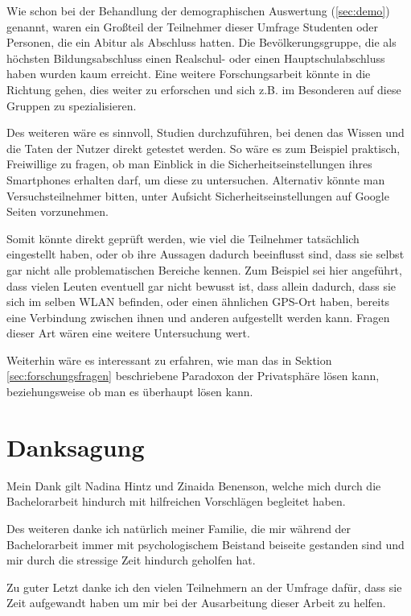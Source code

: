 Wie schon bei der Behandlung der demographischen Auswertung (\ref{sec:demo}) genannt, waren ein Großteil der Teilnehmer dieser Umfrage Studenten oder Personen, die ein Abitur als Abschluss hatten. Die Bevölkerungsgruppe, die als höchsten Bildungsabschluss einen Realschul- oder einen Hauptschulabschluss haben wurden kaum erreicht. Eine weitere Forschungsarbeit könnte in die Richtung gehen, dies weiter zu erforschen und sich z.B. im Besonderen auf diese Gruppen zu spezialisieren.

Des weiteren wäre es sinnvoll, Studien durchzuführen, bei denen das Wissen und die Taten der Nutzer direkt getestet werden. So wäre es zum Beispiel praktisch, Freiwillige zu fragen, ob man Einblick in die Sicherheitseinstellungen ihres Smartphones erhalten darf, um diese zu untersuchen. Alternativ könnte man Versuchsteilnehmer bitten, unter Aufsicht Sicherheitseinstellungen auf Google Seiten vorzunehmen.

Somit könnte direkt geprüft werden, wie viel die Teilnehmer tatsächlich eingestellt haben, oder ob ihre Aussagen dadurch beeinflusst sind, dass sie selbst gar nicht alle problematischen Bereiche kennen. Zum Beispiel sei hier angeführt, dass vielen Leuten eventuell gar nicht bewusst ist, dass allein dadurch, dass sie sich im selben WLAN befinden, oder einen ähnlichen GPS-Ort haben, bereits eine Verbindung zwischen ihnen und anderen aufgestellt werden kann. Fragen dieser Art wären eine weitere Untersuchung wert.

Weiterhin wäre es interessant zu erfahren, wie man das in Sektion \ref{sec:forschungsfragen} beschriebene Paradoxon der Privatsphäre lösen kann, beziehungsweise ob man es überhaupt lösen kann.


\chapter{Danksagung}
Mein Dank gilt Nadina Hintz und Zinaida Benenson, welche mich durch die Bachelorarbeit hindurch mit hilfreichen Vorschlägen begleitet haben.

Des weiteren danke ich natürlich meiner Familie, die mir während der Bachelorarbeit immer mit psychologischem Beistand beiseite gestanden sind und mir durch die stressige Zeit hindurch geholfen hat.

Zu guter Letzt danke ich den vielen Teilnehmern an der Umfrage dafür, dass sie Zeit aufgewandt haben um mir bei der Ausarbeitung dieser Arbeit zu helfen.
